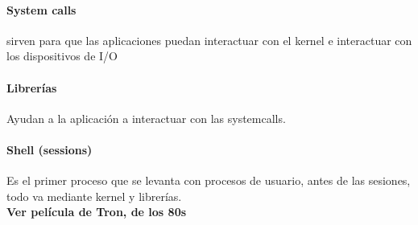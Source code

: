 \paragraph{System calls} sirven para que las aplicaciones puedan interactuar con el kernel e interactuar con los dispositivos de I/O \\

\paragraph{Librer\'{i}as} Ayudan a la aplicaci\'{o}n a interactuar con las systemcalls.\\

\paragraph{Shell (sessions)} Es el primer proceso que se levanta con procesos de usuario, antes de las sesiones, todo va mediante kernel y librer\'{i}as.\\

\textbf{Ver pel\'{i}cula de Tron, de los 80s}\\